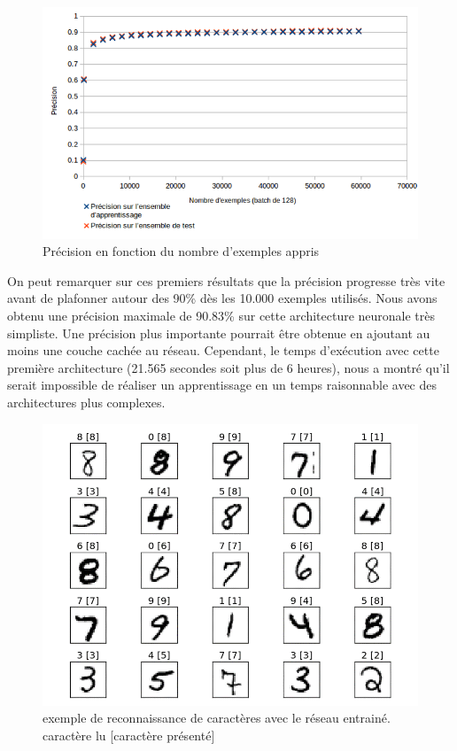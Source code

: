 \begin{figure}[!h]
\begin{center}
\includegraphics[scale=0.5]{images/mnist_apprentissage_128.png}
\caption{Précision en fonction du nombre d'exemples appris}
\label{mnist_apprentissage_128}
\end{center}
\end{figure}

On peut remarquer sur ces premiers résultats que la précision progresse très vite avant de plafonner autour des 90\% dès les 10.000 exemples utilisés. Nous avons obtenu une précision maximale de 90.83\% sur cette architecture neuronale très simpliste. Une précision plus importante pourrait être obtenue en ajoutant au moins une couche cachée au réseau. Cependant, le temps d'exécution avec cette première architecture (21.565 secondes soit plus de 6 heures), nous a montré qu'il serait impossible de réaliser un apprentissage en un temps raisonnable avec des architectures plus complexes.
\label{resultat_premiere_implementation}

\begin{figure}[!h]
\begin{center}
\includegraphics[scale=0.5]{images/mnist.png}
\caption{exemple de reconnaissance de caractères avec le réseau entrainé. caractère lu [caractère présenté]}
\label{mnist}
\end{center}
\end{figure}

